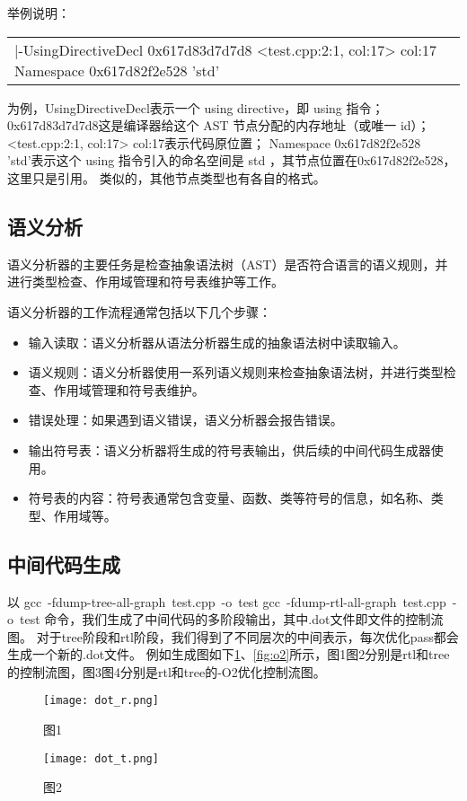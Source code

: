 \documentclass[UTF8,a4paper,10pt]{ctexart}
\begin{document}
举例说明：
\begin{tabularx}{\textwidth}{>{\ttfamily}X}
|-UsingDirectiveDecl 0x617d83d7d7d8 <test.cpp:2:1, col:17> col:17 Namespace 0x617d82f2e528 'std'\\
\end{tabularx}
为例，UsingDirectiveDecl表示一个 using directive，即 using 指令；
0x617d83d7d7d8这是编译器给这个 AST 节点分配的内存地址（或唯一 id）；
<test.cpp:2:1, col:17> col:17表示代码原位置；
Namespace 0x617d82f2e528 'std'表示这个 using 指令引入的命名空间是 std
，其节点位置在0x617d82f2e528，这里只是引用。
类似的，其他节点类型也有各自的格式。
\par

\subsection{语义分析}
语义分析器的主要任务是检查抽象语法树（AST）是否符合语言的语义规则，并进行类型检查、作用域管理和符号表维护等工作。
\par
语义分析器的工作流程通常包括以下几个步骤：
\begin{itemize}
  \item 输入读取：语义分析器从语法分析器生成的抽象语法树中读取输入。
  \item 语义规则：语义分析器使用一系列语义规则来检查抽象语法树，并进行类型检查、作用域管理和符号表维护。
  \item 错误处理：如果遇到语义错误，语义分析器会报告错误。
  \item 输出符号表：语义分析器将生成的符号表输出，供后续的中间代码生成器使用。    
  \item 符号表的内容：符号表通常包含变量、函数、类等符号的信息，如名称、类型、作用域等。
\end{itemize}

\subsection{中间代码生成}
以
gcc\ -fdump-tree-all-graph\  test.cpp\ -o\ test
gcc\ -fdump-rtl-all-graph\  test.cpp\ -o\ test
命令，我们生成了中间代码的多阶段输出，其中.dot文件即文件的控制流图。
对于tree阶段和rtl阶段，我们得到了不同层次的中间表示，每次优化pass都会生成一个新的.dot文件。
例如生成图如下\ref{fig:o}、\ref{fig:o2}所示，图1图2分别是rtl和tree的控制流图，图3图4分别是rtl和tree的-O2优化控制流图。
\begin{figure}[H]
  \centering
  \begin{minipage}[t]{0.48\textwidth}
    \centering
    \texttt{[image: dot\_r.png]}
    \caption{图1}
    
  \end{minipage}%
  \hfill
  \begin{minipage}[t]{0.48\textwidth}
    \centering
    \texttt{[image: dot\_t.png]}
    \caption{图2}
    
  \end{minipage}
  \label{fig:o}
\end{figure}
\end{document}
